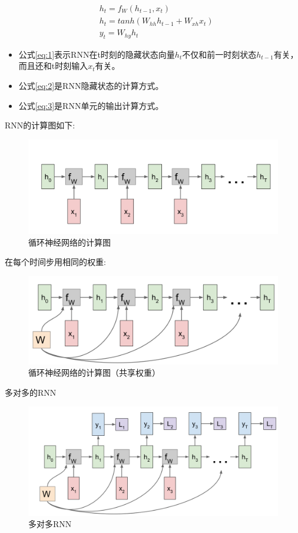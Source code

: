 \documentclass{article}
\begin{document}
\begin{align}
&h_t = f_W(h_{t-1},x_t)\label{eq:1}\\
&h_t = tanh(W_{hh}h_{t-1}+W_{xh}x_t)\label{eq:2}\\
&y_t=W_{hy}h_t\label{eq:3}
\end{align}
\begin{itemize}
\item 公式\ref{eq:1}表示RNN在t时刻的隐藏状态向量$h_t$不仅和前一时刻状态$h_{t-1}$有关，而且还和t时刻输入$x_t$有关。
\item 公式\ref{eq:2}是RNN隐藏状态的计算方式。
\item 公式\ref{eq:3}是RNN单元的输出计算方式。
\end{itemize}
RNN的计算图如下:
\begin{figure}[H]
\centering
\includegraphics[scale=0.5]{figure/RNN_CG.PNG}
\caption{循环神经网络的计算图}
\label{fig:2}
\end{figure}
在每个时间步用相同的权重:
\begin{figure}[H]
\centering
\includegraphics[scale=0.5]{figure/RNN_SW.PNG}
\caption{循环神经网络的计算图（共享权重）}
\label{fig:3}
\end{figure}
多对多的RNN
\begin{figure}[H]
\centering
\includegraphics[scale=0.4]{figure/RNN_M2M.PNG}
\caption{多对多RNN}
\label{fig:4}
\end{figure}
\end{document}

